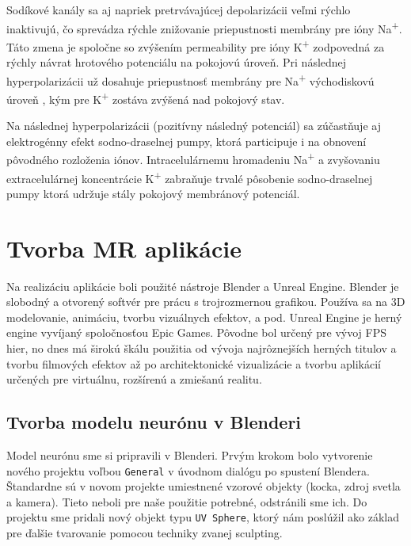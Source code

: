 Sodíkové kanály sa aj napriek pretrvávajúcej depolarizácii veľmi rýchlo inaktivujú, čo sprevádza rýchle znižovanie priepustnosti membrány pre ióny Na\textsuperscript{+}. Táto zmena je spoločne 
so zvýšením permeability pre ióny K\textsuperscript{+} zodpovedná za rýchly návrat hrotového potenciálu na pokojovú úroveň. Pri následnej hyperpolarizácii už dosahuje priepustnosť membrány pre 
Na\textsuperscript{+} východiskovú úroveň , kým pre K\textsuperscript{+} zostáva zvýšená nad pokojový stav.

Na následnej hyperpolarizácii (pozitívny následný potenciál) sa zúčastňuje aj elektrogénny efekt sodno-draselnej pumpy, ktorá participuje i na obnovení pôvodného rozloženia iónov.
Intracelulárnemu hromadeniu Na\textsuperscript{+} a zvyšovaniu extracelulárnej koncentrácie K\textsuperscript{+} zabraňuje trvalé pôsobenie sodno-draselnej pumpy ktorá udržuje stály pokojový 
membránový potenciál. \cite{javorkaLekarskaFyziologiaUcebnica2001}

\section{Tvorba MR aplikácie}

Na realizáciu aplikácie boli použité nástroje Blender a Unreal Engine. Blender je slobodný a otvorený  softvér pre prácu s trojrozmernou grafikou. Používa sa na 3D modelovanie,
animáciu, tvorbu vizuálnych efektov, a pod. Unreal Engine je herný engine vyvíjaný spoločnosťou Epic Games. Pôvodne bol určený pre vývoj FPS hier, no dnes má širokú škálu použitia
od vývoja najrôznejších herných titulov a tvorbu filmových efektov až po architektonické vizualizácie a tvorbu aplikácií určených pre virtuálnu, rozšírenú a zmiešanú realitu.

\subsection{Tvorba modelu neurónu v Blenderi}
Model neurónu sme si pripravili v Blenderi. Prvým krokom bolo vytvorenie nového projektu voľbou \texttt{General} v úvodnom dialógu po spustení Blendera. Štandardne sú v novom projekte 
umiestnené vzorové objekty (kocka, zdroj svetla a kamera). Tieto neboli pre naše použitie potrebné, odstránili sme ich. Do projektu sme pridali nový objekt typu \texttt{UV Sphere}, 
ktorý nám poslúžil ako základ pre ďalšie tvarovanie pomocou techniky zvanej sculpting. 

